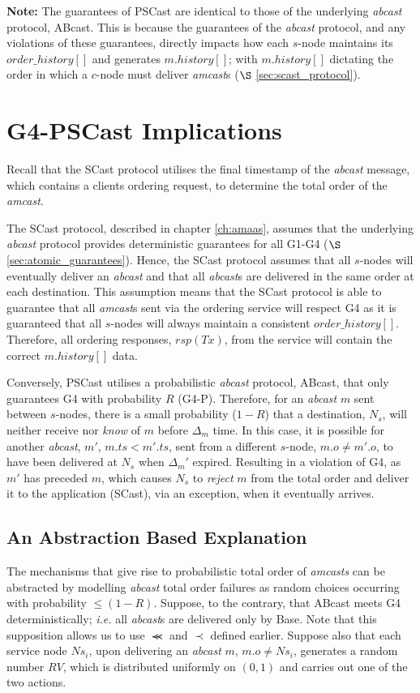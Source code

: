 \textbf{Note:} The guarantees of \textsf{PSCast} are identical to those of the underlying \emph{abcast} protocol, \textsf{ABcast}.  This is because the guarantees of the \emph{abcast} protocol, and any violations of these guarantees, directly impacts how each $s$-node maintains its $order\_history[]$ and generates $m.history[]$; with $m.history[]$ dictating the order in which a $c$-node must deliver \emph{amcast}s ($\S$ \ref{sec:scast_protocol}).  

\section{G4-PSCast Implications}
Recall that the \textsf{SCast} protocol utilises the final timestamp of the \emph{abcast} message, which contains a clients ordering request, to determine the total order of the \emph{amcast}.  

The \textsf{SCast} protocol, described in chapter \ref{ch:amaas}, assumes that the underlying \emph{abcast} protocol provides deterministic guarantees for all G1-G4 ($\S$ \ref{sec:atomic_guarantees}).  Hence, the \textsf{SCast} protocol assumes that all $s$-nodes will eventually deliver an \emph{abcast} and that all \emph{abcast}s are delivered in the same order at each destination.  This assumption means that the \textsf{SCast} protocol is able to guarantee that all \emph{amcast}s sent via the ordering service will respect G4 as it is guaranteed that all $s$-nodes will always maintain a consistent $order\_history[]$.  Therefore, all ordering responses, $rsp(Tx)$, from the service will contain the correct $m.history[]$ data.  

Conversely, \textsf{PSCast} utilises a probabilistic \emph{abcast} protocol, \textsf{ABcast}, that only guarantees G4 with probability $R$ (G4-P).  Therefore, for an \emph{abcast} $m$ sent between $s$-nodes, there is a small probability ($1-R$) that a destination, $N_s$, will neither receive nor \emph{know} of $m$ before $\Delta_m$ time.  In this case, it is possible for another \emph{abcast}, $m'$, $m.ts < m'.ts$, sent from a different $s$-node, $m.o \neq m'.o$, to have been delivered at $N_s$ when $\Delta_m'$ expired.  Resulting in a violation of G4, as $m'$ has preceded $m$, which causes $N_s$ to \emph{reject} $m$ from the total order and deliver it to the application (\textsf{SCast}), via an exception, when it eventually arrives.  

\subsection{An Abstraction Based Explanation}
The mechanisms that give rise to probabilistic total order of \emph{amcasts} can be abstracted by modelling \emph{abcast} total order failures as random choices occurring with probability $\leq (1 - R)$.  Suppose, to the contrary, that \textsf{ABcast} meets G4 deterministically; \emph{i.e.} all \emph{abcast}s are delivered only by \textsf{Base}.  Note that this supposition allows us to use $\llcurly$ and $\prec$ defined earlier.  Suppose also that each service node $Ns_i$, upon delivering an \emph{abcast} $m$, $m.o \neq Ns_i$, generates a random number $RV$, which is distributed uniformly on $(0,1)$ and carries out one of the two actions.  

